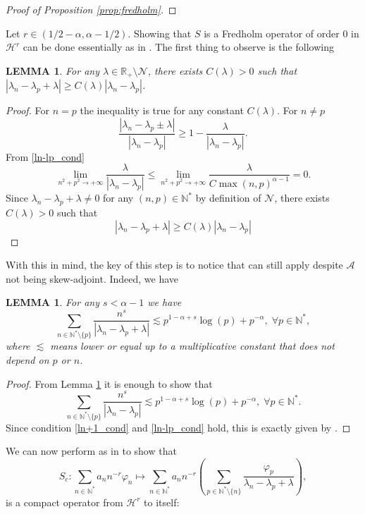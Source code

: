 \documentclass[11pt, dvipsnames]{amsart}
\newtheorem{lem}[theorem]{LEMMA}
\begin{document}
\begin{proof}[Proof of Proposition \ref{prop:fredholm}]
    
\end{proof}Let $r\in(1/2-\alpha, \alpha-1/2)$. Showing that $S$ is a Fredholm operator of order 0 in $\mathcal{H}^{r}$ can be done essentially as in \cite{Gagnon2022-fredholm}. The first thing to observe is the following
\begin{lem}
\label{lem:lambda}
    For any $\lambda\in\mathbb{R}_{+}\setminus\mathcal{N}$, there exists $C(\lambda)>0$ such that 
    $|\lambda_n-\lambda_p+\lambda|\geq C(\lambda)|\lambda_n-\lambda_p|$.
\end{lem}
\begin{proof}
For $n=p$ the inequality is true for any constant $C(\lambda)$. For $n\neq p$
      \begin{equation}
      \frac{|\lambda_{n}-\lambda_{p}\pm\lambda|}{|\lambda_{n}-\lambda_{p}|} \geq       1 - \frac{\lambda}{|\lambda_{n}-\lambda_{p}|}.
      \end{equation}
      From \eqref{ln-lp_cond} 
      $$
      \lim\limits_{n^{2}+p^{2}\rightarrow +\infty} \frac{\lambda}{|\lambda_{n}-\lambda_{p}|} \leq \lim\limits_{n^{2}+p^{2}\rightarrow +\infty}\frac{\lambda}{C\max(n,p)^{\alpha-1}} = 0.
      $$
      Since $\lambda_{n}-\lambda_{p}+\lambda \neq 0$ for any $(n,p)\in\mathbb{N}^{*}$ by definition of $\mathcal{N}$, there exists $C(\lambda)>0$ such that
$$|\lambda_n-\lambda_p+\lambda|\geq C(\lambda)|\lambda_n-\lambda_p|$$
\end{proof}
With this in mind, the key of this step is to notice that \cite[Lemma 4.6]{Gagnon2022-fredholm} can still apply despite $\mathcal{A}$ not being skew-adjoint. Indeed, we have 
\begin{lem}
\label{lem:tech}
For any $s<\alpha-1$ we have
\begin{equation} \sum\limits_{n\in\mathbb{N}^{*}\setminus\{p\}}\frac{n^{s}}{|\lambda_{n}-\lambda_{p}+\lambda|}\lesssim p^{1- \alpha+ s}\log(p)+p^{-\alpha}, \; \forall p\in \mathbb{N}^*,
\end{equation}
where $\lesssim$ means lower or equal up to a multiplicative constant that does not depend on $p$ or $n$.
\end{lem}
\begin{proof}
From Lemma \ref{lem:lambda} it is enough to show that
\begin{equation} \sum\limits_{n\in\mathbb{N}^{*}\setminus\{p\}}\frac{n^{s}}{|\lambda_{n}-\lambda_{p}|}\lesssim p^{1- \alpha+ s}\log(p)+p^{-\alpha}, \; \forall p\in \mathbb{N}^*.
\end{equation}
Since condition \eqref{ln+1_cond} and \eqref{ln-lp_cond} hold, this is exactly given by \cite[Lemma 4.2]{Gagnon2022-fredholm}.
\end{proof}
We can now perform as in \cite[Lemma 4.7]{Gagnon2022-fredholm} to show that
\begin{equation}
\label{eq:sc}
    S_c:  \sum\limits_{n\in\mathbb{N}^{*}}a_{n}n^{-r}\varphi_{n} \mapsto \sum\limits_{n\in\mathbb{N}^{*}}a_{n}n^{-r}\left(\sum\limits_{p\in\mathbb{N}^{*}\setminus\{n\}}\frac{\varphi_{p}}{\lambda_{n}-\lambda_{p}+\lambda}\right),
\end{equation}
is a compact operator from $\mathcal{H}^{r}$ to itself: 
\end{document}

